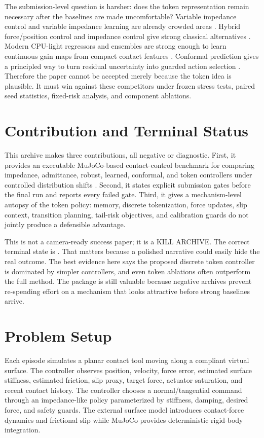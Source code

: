 \documentclass{article}
\begin{document}
The submission-level question is harsher:
does the token representation remain necessary after the baselines are made uncomfortable?
Variable impedance control and variable impedance learning are already crowded areas \citep{kronander2016stability,abudakka2020review,buchli2011learning}.
Hybrid force/position control and impedance control give strong classical alternatives \citep{raibert1981hybrid,hogan1985impedance1}.
Modern CPU-light regressors and ensembles are strong enough to learn continuous gain maps from compact contact features \citep{breiman2001random,pedregosa2011scikit}.
Conformal prediction gives a principled way to turn residual uncertainty into guarded action selection \citep{shafer2008conformal}.
Therefore the paper cannot be accepted merely because the token idea is plausible.
It must win against these competitors under frozen stress tests, paired seed statistics, fixed-risk analysis, and component ablations.

\section{Contribution and Terminal Status}
This archive makes three contributions, all negative or diagnostic.
First, it provides an executable MuJoCo-based contact-control benchmark for comparing impedance, admittance, robust, learned, conformal, and token controllers under controlled distribution shifts \citep{todorov2012mujoco}.
Second, it states explicit submission gates before the final run and reports every failed gate.
Third, it gives a mechanism-level autopsy of the token policy: memory, discrete tokenization, force updates, slip context, transition planning, tail-risk objectives, and calibration guards do not jointly produce a defensible advantage.

This is not a camera-ready success paper; it is a KILL ARCHIVE.
The correct terminal state is \textbf{\PaperDecision{}}.
That matters because a polished narrative could easily hide the real outcome.
The best evidence here says the proposed discrete token controller is dominated by simpler controllers, and even token ablations often outperform the full method.
The package is still valuable because negative archives prevent re-spending effort on a mechanism that looks attractive before strong baselines arrive.

\section{Problem Setup}
Each episode simulates a planar contact tool moving along a compliant virtual surface.
The controller observes position, velocity, force error, estimated surface stiffness, estimated friction, slip proxy, target force, actuator saturation, and recent contact history.
The controller chooses a normal/tangential command through an impedance-like policy parameterized by stiffness, damping, desired force, and safety guards.
The external surface model introduces contact-force dynamics and frictional slip while MuJoCo provides deterministic rigid-body integration.
\end{document}
